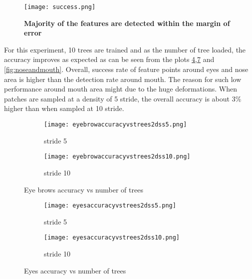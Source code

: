 \begin{figure}
	\centering
	\texttt{[image: success.png]}
	\caption[Success Detection]{\label{fig:success}}  \textbf{Majority of the features are detected within the margin of error}
\end{figure}

For this experiment, 10 trees are trained and as the number of tree loaded, the accuracy improves as expected as can be seen from the plots \ref{fig:eyebrows},\ref{fig:eyes} and \ref{fig:noseandmouth}. Overall, success rate of feature points around eyes and nose area is higher than the detection rate around mouth. The reason for such low performance around mouth area might due to the huge deformations. When patches are sampled at a density of 5 stride, the overall accuracy is about  3\% higher than when sampled at 10 stride. 

\begin{figure}
        \centering
	 \begin{subfigure}[b]{0.5\textwidth}
                \texttt{[image: eyebrowaccuracyvstrees2dss5.png]}
                \caption{stride 5}
                \label{fig:eyebrowstride5}
        \end{subfigure}%
        \begin{subfigure}[b]{0.5\textwidth}
                \texttt{[image: eyebrowaccuracyvstrees2dss10.png]}
                \caption{stride 10}
                \label{fig:eyebrowstride10}
        \end{subfigure}%
        \caption{Eye brows accuracy vs number of trees}\label{fig:eyebrows}
\end{figure}

\begin{figure}
        \centering
	 \begin{subfigure}[b]{0.5\textwidth}
                \texttt{[image: eyesaccuracyvstrees2dss5.png]}
                \caption{stride 5}
                \label{fig:eyesstride5}
        \end{subfigure}%
        \begin{subfigure}[b]{0.5\textwidth}
                \texttt{[image: eyesaccuracyvstrees2dss10.png]}
                \caption{stride 10}
                \label{fig:eyestride5}
        \end{subfigure}%
        \caption{Eyes accuracy vs number of trees}\label{fig:eyes}
\end{figure}

